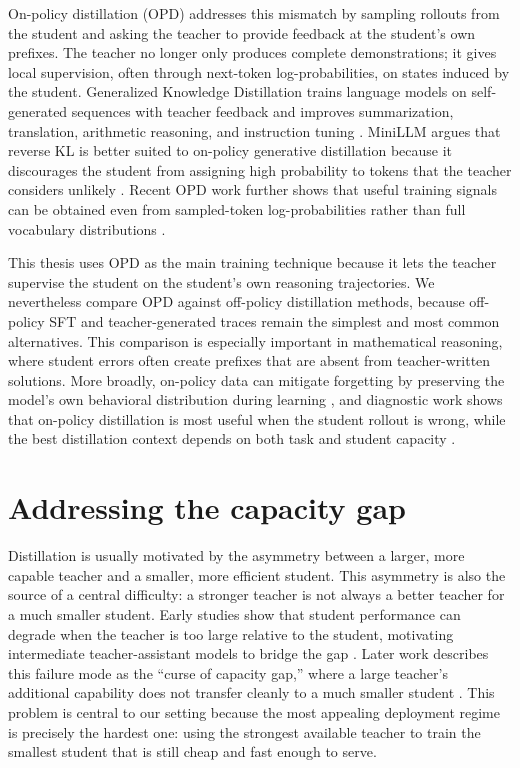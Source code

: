 On-policy distillation (OPD) addresses this mismatch by sampling rollouts from the student and asking the teacher to provide feedback at the student's own prefixes. The teacher no longer only produces complete demonstrations; it gives local supervision, often through next-token log-probabilities, on states induced by the student. Generalized Knowledge Distillation trains language models on self-generated sequences with teacher feedback and improves summarization, translation, arithmetic reasoning, and instruction tuning \citep{agarwalOnPolicyDistillationLanguage2024}. MiniLLM argues that reverse KL is better suited to on-policy generative distillation because it discourages the student from assigning high probability to tokens that the teacher considers unlikely \citep{guMiniLLMOnPolicyDistillation2026}. Recent OPD work further shows that useful training signals can be obtained even from sampled-token log-probabilities rather than full vocabulary distributions \citep{luOnPolicyDistillation2025}.

This thesis uses OPD as the main training technique because it lets the teacher supervise the student on the student's own reasoning trajectories. We nevertheless compare OPD against off-policy distillation methods, because off-policy SFT and teacher-generated traces remain the simplest and most common alternatives. This comparison is especially important in mathematical reasoning, where student errors often create prefixes that are absent from teacher-written solutions. More broadly, on-policy data can mitigate forgetting by preserving the model's own behavioral distribution during learning \citep{chenRetainingDoingRole2025}, and diagnostic work shows that on-policy distillation is most useful when the student rollout is wrong, while the best distillation context depends on both task and student capacity \citep{armandpourUnmaskingOnPolicyDistillation2026}.

\section{Addressing the capacity gap}
Distillation is usually motivated by the asymmetry between a larger, more capable teacher and a smaller, more efficient student. This asymmetry is also the source of a central difficulty: a stronger teacher is not always a better teacher for a much smaller student. Early studies \citep{mirzadehImprovedKnowledgeDistillation2019} show that student performance can degrade when the teacher is too large relative to the student, motivating intermediate teacher-assistant models to bridge the gap \citep{mirzadehImprovedKnowledgeDistillation2019}. Later work describes this failure mode as the ``curse of capacity gap,'' where a large teacher's additional capability does not transfer cleanly to a much smaller student \citep{zhangLiftingCurseCapacity2023}. This problem is central to our setting because the most appealing deployment regime is precisely the hardest one: using the strongest available teacher to train the smallest student that is still cheap and fast enough to serve.


